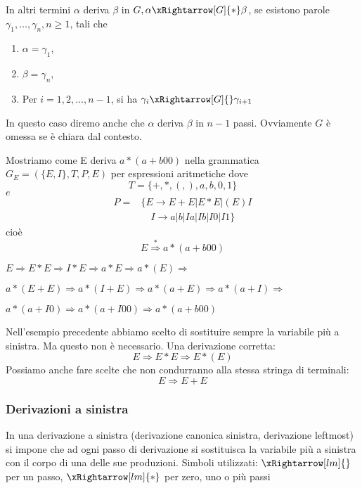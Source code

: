In altri termini $\alpha$ deriva $\beta$ in $G, \alpha \xRightarrow[G]{*} \beta$, se esistono parole $\gamma_{1}, \ldots, \gamma_{n}, n \geq 1$, tali che
\begin{enumerate}
\item  $\alpha=\gamma_{1}$,
\item $\beta=\gamma_{n}$,
\item Per $i=1,2, \ldots, n-1$, si ha $\gamma_{i} \xRightarrow[G]{} \gamma_{i+1}$
\end{enumerate}
In questo caso diremo anche che $\alpha$ deriva $\beta$ in $n-1$ passi. Ovviamente $G$ è omessa se è chiara dal contesto.

Mostriamo come E deriva $a *(a+b 00)$ nella grammatica $G_{E}=(\{E, I\}, T, P, E)$ per espressioni aritmetiche dove
$$
T=\{+, *,(,), a, b, 0,1\}
$$
$e$
$$
\begin{aligned}
P=&\{E \rightarrow E+E|E * E|(E) I \\
&\quad I \rightarrow a|b| Ia| Ib|I 0| I1\}
\end{aligned}
$$
cioè
$$
E \stackrel{*}{\Rightarrow} a *(a+b 00)
$$

$E \Rightarrow E * E \Rightarrow I * E \Rightarrow a * E \Rightarrow a *(E) \Rightarrow$

$a *(E+E) \Rightarrow a *(I+E) \Rightarrow a *(a+E) \Rightarrow a *(a+I) \Rightarrow$

$a *(a+I0) \Rightarrow a *(a+I00) \Rightarrow a *(a+b 00)$

\vspace{5mm}

Nell'esempio precedente abbiamo scelto di sostituire sempre la variabile più a sinistra. Ma questo non è necessario.
Una derivazione corretta:
$$
E \Rightarrow E * E \Rightarrow E *(E)
$$
Possiamo anche fare scelte che non condurranno alla stessa stringa di terminali:
$$
E \Rightarrow E+E
$$

\subsubsection{Derivazioni a sinistra}
In una derivazione a sinistra (derivazione canonica sinistra, derivazione leftmost) si impone che ad ogni passo di derivazione si sostituisca la variabile più a sinistra con il corpo di una delle sue produzioni.
Simboli utilizzati:
$\xRightarrow[lm]{}$ per un passo, $\xRightarrow[lm]{*}$ per zero, uno o più passi

\vspace{5mm}

